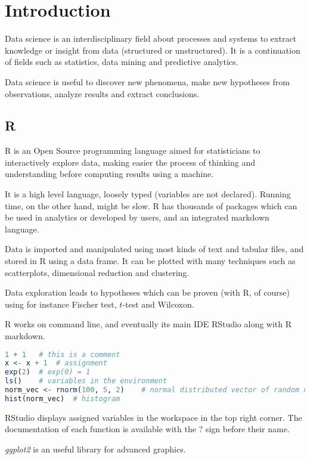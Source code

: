 \section{Introduction}
Data science is an interdisciplinary field about processes and systems to extract knowledge or insight from data (structured or unstructured). It is a continuation of fields such as statistics, data mining and predictive analytics. 

Data science is useful to discover new phenomena, make new hypotheses from observations, analyze results and extract conclusions. 

\subsection{R}
R is an Open Source programming language aimed for statisticians to interactively explore data, making easier the process of thinking and understanding before computing results using a machine. 

It is a high level language, loosely typed (variables are not declared). Running time, on the other hand, might be slow. R has thousands of packages which can be used in analytics or developed by users, and an integrated markdown language.

Data is imported and manipulated using most kinds of text and tabular files, and stored in R using a data frame. It can be plotted with many techniques such as scatterplots, dimensional reduction and clustering. 

Data exploration leads to hypotheses which can be proven (with R, of course) using for instance Fischer test, $t$-test and Wilcoxon. 

R works on command line, and eventually its main IDE RStudio along with R markdown. 
\begin{lstlisting}[language=R]
1 + 1	# this is a comment
x <- x + 1	# assignment
exp(2)	# exp(0) = 1
ls()	# variables in the environment
norm_vec <- rnorm(100, 5, 2)	# normal distributed vector of random numbers
hist(norm_vec)	# histogram
\end{lstlisting}
RStudio displays assigned variables in the workspace in the top right corner. The documentation of each function is available with the $?$ sign before their name.

\textit{ggplot2} is an useful library for advanced graphics. 


